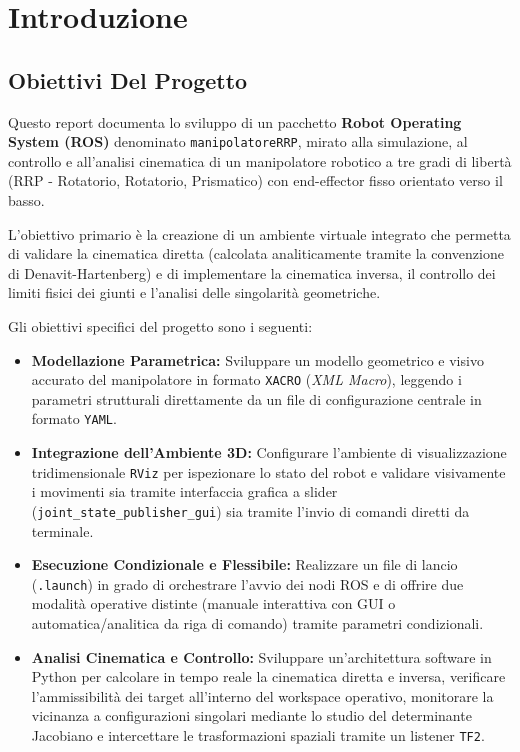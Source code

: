 \documentclass[11pt, a4paper]{report}
\begin{document}
\tableofcontents
\cleardoublepage


\chapter{Introduzione}
\section{Obiettivi Del Progetto}
Questo report documenta lo sviluppo di un pacchetto \textbf{Robot Operating System (ROS)} denominato \texttt{manipolatoreRRP}, mirato alla simulazione, al controllo e all'analisi cinematica di un manipolatore robotico a tre gradi di libertà (RRP - Rotatorio, Rotatorio, Prismatico) con end-effector fisso orientato verso il basso.

L'obiettivo primario è la creazione di un ambiente virtuale integrato che permetta di validare la cinematica diretta (calcolata analiticamente tramite la convenzione di Denavit-Hartenberg) e di implementare la cinematica inversa, il controllo dei limiti fisici dei giunti e l'analisi delle singolarità geometriche.

Gli obiettivi specifici del progetto sono i seguenti:
\begin{itemize}
    \item \textbf{Modellazione Parametrica:} Sviluppare un modello geometrico e visivo accurato del manipolatore in formato \texttt{XACRO} (\textit{XML Macro}), leggendo i parametri strutturali direttamente da un file di configurazione centrale in formato \texttt{YAML}.

    \item \textbf{Integrazione dell'Ambiente 3D:} Configurare l'ambiente di visualizzazione tridimensionale \texttt{RViz} per ispezionare lo stato del robot e validare visivamente i movimenti sia tramite interfaccia grafica a slider (\texttt{joint\_state\_publisher\_gui}) sia tramite l'invio di comandi diretti da terminale.

    \item \textbf{Esecuzione Condizionale e Flessibile:} Realizzare un file di lancio (\texttt{.launch}) in grado di orchestrare l'avvio dei nodi ROS e di offrire due modalità operative distinte (manuale interattiva con GUI o automatica/analitica da riga di comando) tramite parametri condizionali.

    \item \textbf{Analisi Cinematica e Controllo:} Sviluppare un'architettura software in Python per calcolare in tempo reale la cinematica diretta e inversa, verificare l'ammissibilità dei target all'interno del workspace operativo, monitorare la vicinanza a configurazioni singolari mediante lo studio del determinante Jacobiano e intercettare le trasformazioni spaziali tramite un listener \texttt{TF2}.
\end{itemize}
\end{document}
